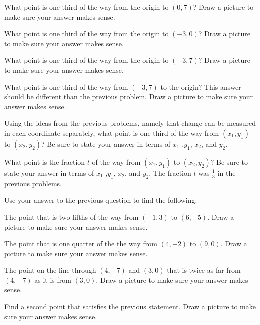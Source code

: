 \bq\label{q13} What point is one third of the way from the origin to $(0,7)$? Draw a picture to make sure your answer makes sense.
\eq

\bq What point is one third of the way from the origin to $(-3,0)$? Draw a picture to make sure your answer makes sense.
\eq

\bq What point is one third of the way from the origin to $(-3,7)$? Draw a picture to make sure your answer makes sense.
\eq

\bq What point is one third of the way from $(-3,7)$ to the origin? This answer should be \underline{different} than the previous problem. Draw a picture to make sure your answer makes sense.
\eq

\bq Using the ideas from the previous problems, namely that change can be measured in each coordinate separately, what point is one third of the way from $(x_1,y_1)$ to $(x_2,y_2)$? Be sure to state your answer in terms of $x_1$ ,$y_1$, $x_2$, and $y_2$.
\eq

\bq What point is the fraction $t$ of the way from $(x_1,y_1)$ to $(x_2,y_2)$? Be sure to state your answer in terms of $x_1$ ,$y_1$, $x_2$, and $y_2$. The fraction $t$ was $\frac{1}{3}$ in the previous problems.
\eq

\bq\label{q14} Use your answer to the previous question to find the following:
\be
\item The point that is two fifths of the way from $(-1,3)$ to $(6,-5)$. Draw a picture to make sure your answer makes sense.
\item The point that is one quarter of the the way from $(4,-2)$ to $(9,0)$. Draw a picture to make sure your answer makes sense.
\item The point on the line through $(4,-7)$ and $(3,0)$ that is twice as far from $(4,-7)$ as it is from $(3,0)$. Draw a picture to make sure your answer makes sense.
\item Find a second point that satisfies the previous statement. Draw a picture to make sure your answer makes sense.
\ee
\eq



